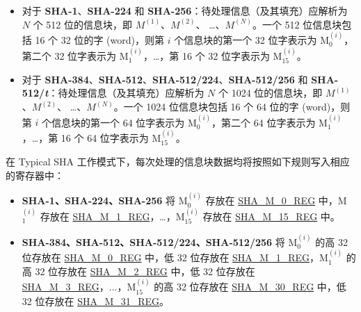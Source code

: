 \documentclass[main\_\_CN.tex]{subfiles}
\begin{document}
\begin{itemize}
    \item 对于 \textbf{SHA-1}、\textbf{SHA-224} 和 \textbf{SHA-256}：待处理信息（及其填充）应解析为 \begin{math}N\end{math} 个 512 位的信息块，即 \begin{math}M^{(1)}\end{math}、\begin{math}M^{(2)}\end{math}、 \dots、\begin{math}M^{(N)}\end{math}。一个 512 位信息块包括 16 个 32 位的字 (word)，则第 \begin{math}i\end{math} 个信息块的第一个 32 位字表示为 M$^{(i)}_{0}$，第二个 32 位字表示为 M$^{(i)}_{1}$，\dots，第 16 个 32 位字表示为 M$^{(i)}_{15}$。
    \item 对于 \textbf{SHA-384}、\textbf{SHA-512}、\textbf{SHA-512/224}、\textbf{SHA-512/256} 和 \textbf{SHA-512/\it{t}}：待处理信息（及其填充）应解析为 \begin{math}N\end{math} 个 1024 位的信息块，即 \begin{math}M^{(1)}\end{math}、\begin{math}M^{(2)}\end{math}、 \dots、\begin{math}M^{(N)}\end{math}。一个 1024 位信息块包括 16 个 64 位的字 (word)，则第 \begin{math}i\end{math} 个信息块的第一个 64 位字表示为 M$^{(i)}_{0}$，第二个 64 位字表示为 M$^{(i)}_{1}$，\dots，第 16 个 64 位字表示为 M$^{(i)}_{15}$。
\end{itemize}

在 Typical SHA 工作模式下，每次处理的信息块数据均将按照如下规则写入相应的寄存器中：
\begin{itemize}
    \item \textbf{SHA-1、SHA-224、SHA-256} 将 M$^{(i)}_{0}$ 存放在 \hyperref[regdesc:SHAMNREG]{SHA\_M\_0\_REG} 中，M$^{(i)}_1$ 存放在 \hyperref[regdesc:SHAMNREG]{SHA\_M\_1\_REG}，\dots，M$^{(i)}_{15}$ 存放在 \hyperref[regdesc:SHAMNREG]{SHA\_M\_15\_REG} 中。
    \item \textbf{SHA-384、SHA-512、SHA-512/224、SHA-512/256} 将 M$^{(i)}_0 $ 的高 32 位存放在 \hyperref[regdesc:SHAMNREG]{SHA\_M\_0\_REG} 中，低 32 位存放在 \hyperref[regdesc:SHAMNREG]{SHA\_M\_1\_REG}，M$^{(i)}_1 $ 的高 32 位存放在 \hyperref[regdesc:SHAMNREG]{SHA\_M\_2\_REG} 中，低 32 位存放在 \hyperref[regdesc:SHAMNREG]{SHA\_M\_3\_REG}，...，M$^{(i)}_{15}$ 的高 32 位存放在 \hyperref[regdesc:SHAMNREG]{SHA\_M\_30\_REG} 中，低 32 位存放在 \hyperref[regdesc:SHAMNREG]{SHA\_M\_31\_REG}。

\end{itemize}
\end{document}

